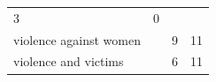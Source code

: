 \documentclass[]{tufte-handout}
\begin{document}
\begin{longtable}[]{@{}llll@{}}
\begin{minipage}[t]{0.06\columnwidth}
3\strut
\end{minipage} & \begin{minipage}[t]{0.06\columnwidth}\raggedright\strut
0\strut
\end{minipage}\tabularnewline
\begin{minipage}[t]{0.63\columnwidth}\raggedright\strut
violence against women\strut
\end{minipage} & \begin{minipage}[t]{0.04\columnwidth}\raggedright\strut
\strut
\end{minipage} & \begin{minipage}[t]{0.06\columnwidth}\raggedright\strut
9\strut
\end{minipage} & \begin{minipage}[t]{0.06\columnwidth}\raggedright\strut
11\strut
\end{minipage}\tabularnewline
\begin{minipage}[t]{0.63\columnwidth}\raggedright\strut
violence and victims\strut
\end{minipage} & \begin{minipage}[t]{0.04\columnwidth}\raggedright\strut
\strut
\end{minipage} & \begin{minipage}[t]{0.06\columnwidth}\raggedright\strut
6\strut
\end{minipage} & \begin{minipage}[t]{0.06\columnwidth}\raggedright\strut
11\strut
\end{minipage}\tabularnewline
\bottomrule
\end{longtable}
\end{document}
